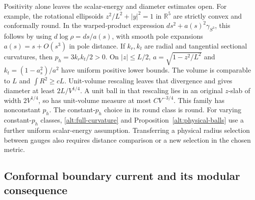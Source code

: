Positivity alone leaves the scalar-energy and diameter estimates
open. For example, the rotational ellipsoids
\(z^2/L^2+|y|^2=1\) in \(\mathbb R^5\) are strictly convex and
conformally round. In the warped-product expression
\(ds^2+a(s)^2\gamma_{S^3}\), this follows by using
\(d\log\rho=ds/a(s)\), with smooth pole expansions
\(a(s)=s+O(s^3)\) in pole distance. If \(k_r,k_t\) are radial
and tangential sectional curvatures, then
\(p_h=3k_rk_t/2>0\). On \(|z|\le L/2\),
\(a=\sqrt{1-z^2/L^2}\) and \(k_t=(1-a_s^2)/a^2\) have uniform
positive lower bounds. The volume is comparable to \(L\) and
\(\int R^2\ge cL\). Unit-volume rescaling leaves that divergence
and gives diameter at least \(2L/V^{1/4}\). A unit ball in that
rescaling lies in an original \(z\)-slab of width \(2V^{1/4}\),
so has unit-volume measure at most \(CV^{-3/4}\). This family has
nonconstant \(p_h\). The constant-\(p_h\) choice in its round class
is round. For varying constant-\(p_h\) classes,
\eqref{alt:full-curvature} and Proposition~\ref{alt:physical-balls}
use a further uniform scalar-energy assumption. Transferring a
physical radius selection between gauges also requires distance
comparison or a new selection in the chosen metric.

\subsection{Conformal boundary current and its modular consequence}

